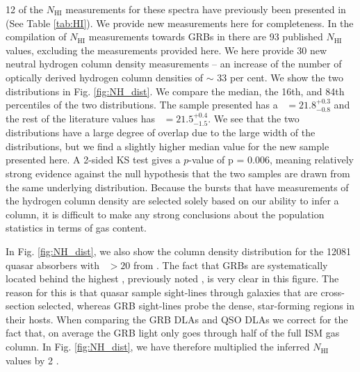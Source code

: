 \documentclass[longauth]{aa}    %
\begin{document}
12 of the $N_{\mathrm{HI}}$ measurements for these spectra have previously been
presented in \citet{Cucchiara2015} (See Table \ref{tab:HI}). We provide new
measurements here for completeness. In the compilation of $N_{\mathrm{HI}}$
measurements towards GRBs in \citet{Tanvir2017} there are 93 published
$N_{\mathrm{HI}}$ values, excluding the measurements provided here. We here
provide 30 new neutral hydrogen column density measurements -- an increase of
the number of optically derived hydrogen column densities of $\sim$ 33 per cent.
We show the two distributions in  Fig. \ref{fig:NH_dist}. We compare the median,
the 16th, and 84th percentiles of the two distributions. The sample presented
has a \nh~$= 21.8_{-0.8}^{+0.3}$ and the rest of the literature values has
\nh~$= 21.5_{-1.5}^{+0.4}$. We see that the two distributions have a large
degree of overlap due to the large width of the distributions, but we find a
slightly higher median value for the new sample presented here. A 2-sided KS
test gives a $p$-value of p = 0.006, meaning relatively strong evidence against the
null hypothesis that the two samples are drawn from the same underlying distribution.
Because the bursts that have measurements of the hydrogen column density are
selected solely based on our ability to infer a column, it is difficult to make
any strong conclusions about the population statistics in terms of gas content.

In Fig. \ref{fig:NH_dist}, we also show the column density distribution for the
12081 quasar absorbers with \nh~$> 20$ from \citet{Noterdaeme2012b}. The fact
that GRBs are systematically located behind the highest \nh, previously noted
\citep[e.g.,][]{Prochaska2007, Fynbo2009}, is very clear in this figure. The
reason for this is that quasar sample sight-lines through galaxies that are
cross-section selected, whereas GRB sight-lines probe the dense, star-forming
regions in their hosts. When comparing the GRB DLAs and QSO DLAs we correct for
the fact that, on average the GRB light only goes through half of the full ISM
gas column. In Fig. \ref{fig:NH_dist}, we have therefore multiplied the inferred
$N_{\mathrm{HI}}$ values by 2 \citep{Prochaska2008}.
\end{document}
